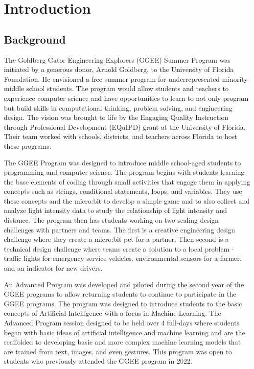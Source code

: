 \documentclass[
]{article}
\begin{document}
\hypertarget{introduction}{%
\section{Introduction}\label{introduction}}

\hypertarget{background}{%
\subsection{Background}\label{background}}

The Goldberg Gator Engineering Explorers (GGEE) Summer Program was
initiated by a generous donor, Arnold Goldberg, to the University of
Florida Foundation. He envisioned a free summer program for
underrepresented minority middle school students. The program would
allow students and teachers to experience computer science and have
opportunities to learn to not only program but build skills in
computational thinking, problem solving, and engineering design. The
vision was brought to life by the Engaging Quality Instruction through
Professional Development (EQuIPD) grant at the University of Florida.
Their team worked with schools, districts, and teachers across Florida
to host these programs.

The GGEE Program was designed to introduce middle school-aged students
to programming and computer science. The program begins with students
learning the base elements of coding through small activities that
engage them in applying concepts such as strings, conditional
statements, loops, and variables. They use these concepts and the
micro:bit to develop a simple game and to also collect and analyze light
intensity data to study the relationship of light intensity and
distance. The program then has students working on two scaling design
challenges with partners and teams. The first is a creative engineering
design challenge where they create a micro:bit pet for a partner. Then
second is a technical design challenge where teams create a solution to
a local problem - traffic lights for emergency service vehicles,
environmental sensors for a farmer, and an indicator for new drivers.

An Advanced Program was developed and piloted during the second year of
the GGEE programs to allow returning students to continue to participate
in the GGEE programs. The program was designed to introduce students to
the basic concepts of Artificial Intelligence with a focus in Machine
Learning. The Advanced Program session designed to be held over 4
full-days where students began with basic ideas of artificial
intelligence and machine learning and are the scaffolded to developing
basic and more complex machine learning models that are trained from
text, images, and even gestures. This program was open to students who
previously attended the GGEE program in 2022.
\end{document}
